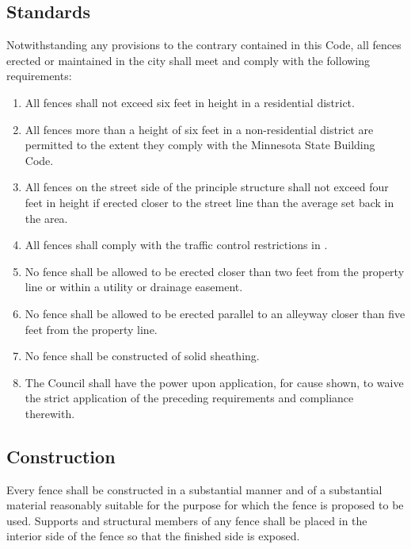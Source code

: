 \subsection{Standards}
Notwithstanding any provisions to the contrary contained in this Code, all fences erected or maintained in the city shall meet and comply with the following requirements:
\begin{enumerate}[{\indent}1)]
    \item All fences shall not exceed six feet in height in a residential district.  
    \item All fences more than a height of six feet in a non-residential district are permitted to the extent they comply with the Minnesota State Building Code.  
    \item All fences on the street side of the principle structure shall not exceed four feet in height if erected closer to the street line than the average set back in the area.  
    \item All fences shall comply with the traffic control restrictions in .
    \item No fence shall be allowed to be erected closer than two feet from the property line or within a utility or drainage easement.
    \item No fence shall be allowed to be erected parallel to an alleyway closer than five feet from the property line.
    \item No fence shall be constructed of solid sheathing.
    \item The Council shall have the power upon application, for cause shown, to waive the strict application of the preceding requirements and compliance therewith.
\end{enumerate}
\subsection{Construction}
Every fence shall be constructed in a substantial manner and of a substantial material reasonably suitable for the purpose for which the fence is proposed to be used.  Supports and structural members of any fence shall be placed in the interior side of the fence so that the finished side is exposed.  
